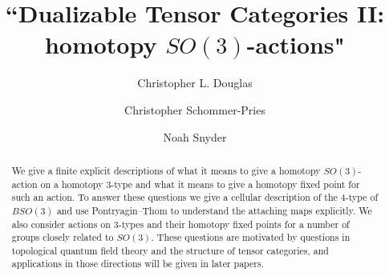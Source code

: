 \documentclass{amsart}
\begin{document}
\title{``Dualizable Tensor Categories II: homotopy $SO(3)$-actions"}

\author{Christopher L. Douglas}
\address{Mathematical Institute\\ University of Oxford\\ Oxford OX1 3LB\\ United Kingdom}
      	
\author{Christopher Schommer-Pries}
\address{Department of Mathematics\\ University of Notre Dame \\ Notre Dame, IN 46556\\ USA}

\author{Noah Snyder}
\address{Department of Mathematics\\ Indiana University\\ Bloomington, IN 47405\\ USA}


\begin{abstract}
We give a finite explicit descriptions of what it means to give a homotopy $SO(3)$-action on a homotopy $3$-type and what it means to give a homotopy fixed point for such an action.  To answer these questions we give a cellular description of the $4$-type of $BSO(3)$ and use Pontryagin--Thom to understand the attaching maps explicitly.  We also consider actions on $3$-types and their homotopy fixed points for a number of groups closely related to $SO(3)$.  These questions are motivated by questions in topological quantum field theory and the structure of tensor categories, and applications in those directions will be given in later papers.
\end{abstract}

\maketitle

\tikzexternaldisable

\tableofcontents



\end{document}
